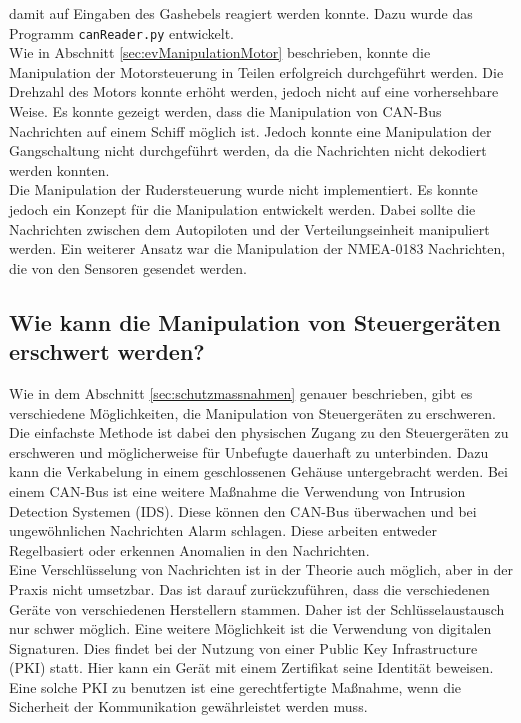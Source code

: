 damit auf Eingaben des Gashebels reagiert werden konnte. Dazu wurde das Programm \texttt{canReader.py} entwickelt.
\\
Wie in Abschnitt \ref{sec:evManipulationMotor} beschrieben, konnte die Manipulation der Motorsteuerung in Teilen 
erfolgreich durchgeführt werden. Die Drehzahl des Motors konnte erhöht werden, jedoch nicht auf eine vorhersehbare Weise.
Es konnte gezeigt werden, dass die Manipulation von CAN-Bus Nachrichten auf einem Schiff möglich ist.
Jedoch konnte eine Manipulation der Gangschaltung nicht durchgeführt werden, da die Nachrichten nicht dekodiert werden konnten.\\
Die Manipulation der Rudersteuerung wurde nicht implementiert. Es konnte jedoch ein Konzept für die Manipulation
entwickelt werden. Dabei sollte die Nachrichten zwischen dem Autopiloten und der Verteilungseinheit manipuliert werden.
Ein weiterer Ansatz war die Manipulation der NMEA-0183 Nachrichten, die von den Sensoren gesendet werden.


\subsection{Wie kann die Manipulation von Steuergeräten erschwert werden?}
Wie in dem Abschnitt \ref{sec:schutzmassnahmen} genauer beschrieben, gibt es verschiedene Möglichkeiten, die Manipulation 
von Steuergeräten zu erschweren.
Die einfachste Methode ist dabei den physischen Zugang zu den Steuergeräten zu erschweren und möglicherweise für Unbefugte 
dauerhaft zu unterbinden.
Dazu kann die Verkabelung in einem geschlossenen Gehäuse untergebracht werden. 
Bei einem CAN-Bus ist eine weitere Maßnahme die Verwendung von Intrusion Detection Systemen (IDS).
Diese können den CAN-Bus überwachen und bei ungewöhnlichen Nachrichten Alarm schlagen. Diese arbeiten entweder Regelbasiert oder erkennen Anomalien in den Nachrichten.
\\
Eine Verschlüsselung von Nachrichten ist in der Theorie auch möglich, aber in der Praxis nicht umsetzbar. Das ist darauf zurückzuführen, dass die verschiedenen
Geräte von verschiedenen Herstellern stammen. Daher ist der Schlüsselaustausch nur schwer möglich. Eine weitere Möglichkeit ist die Verwendung von digitalen Signaturen.
Dies findet bei der Nutzung von einer Public Key Infrastructure (PKI) statt. Hier kann ein Gerät mit einem Zertifikat seine Identität beweisen. 
Eine solche PKI zu benutzen ist eine gerechtfertigte Maßnahme, wenn die Sicherheit der Kommunikation gewährleistet werden muss. \\

